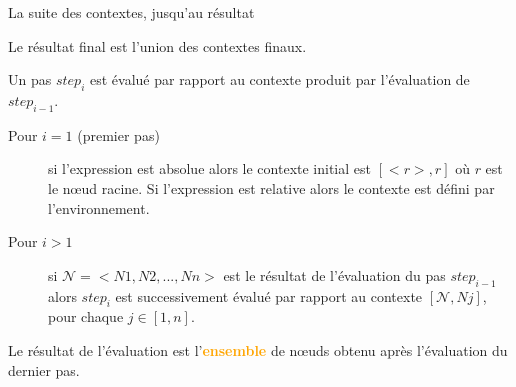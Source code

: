 \begin{frame}[allowframebreaks]{La suite des contextes, jusqu'au résultat}

\begin{center}
\end{center}

Le résultat final est l'union des contextes finaux. 

\framebreak
Un pas $step_i$ est évalué par rapport au contexte produit par l'évaluation de $step_{i-1}$. 

\begin{description}
 \item[Pour $i=1$ (premier pas)] si l'expression est \alert{absolue} alors le contexte initial est $[<r>,r]$
       où $r$ est le n{\oe}ud racine. Si l'expression est \alert{relative} alors le contexte est défini par l'environnement.
\item[Pour $i > 1$] si $\mathcal{N} =< N1,N2,...,Nn >$ est le résultat de l'évaluation du pas $step_{i-1}$ 
     alors $step_i$  est successivement évalué par rapport au contexte $[\mathcal{N},Nj]$, pour chaque $j \in [1,n]$.
\end{description}
Le résultat de l'évaluation est l'\textcolor{orange}{\textbf{ensemble}} de n{\oe}uds obtenu après l'évaluation du dernier pas.

\medskip


\end{frame}



